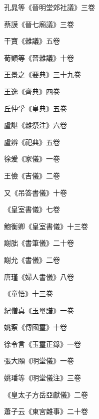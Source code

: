 \begin{pinyinscope}
 孔晁等《晉明堂郊社議》三卷



 蔡謨《晉七廟議》三卷



 干寶《雜議》五卷



 荀顗等《晉雜議》十卷



 王景之《要典》三十九卷



 王逸《齊典》四卷



 丘仲孚《皇典》五卷



 盧諶《雜祭注》六卷



 盧辨《祀典》五卷



 徐爰《家儀》一卷



 王儉《吉儀》二卷



 又《吊答書儀》十卷



 《皇室書儀》七卷



 鮑衡卿《皇室書儀》十三卷



 謝朏《書筆儀》二十卷



 謝允《書儀》二卷



 唐瑾《婦人書儀》八卷



 《童悟》十三卷



 紀僧真《玉璽譜》一卷



 姚察《傳國璽》十卷



 徐令言《玉璽正錄》一卷



 張大頤《明堂儀》一卷



 姚璠等《明堂儀注》三卷



 《皇太子方岳亞獻儀》二卷



 蕭子云《東宮雜事》二十卷




\end{pinyinscope}
